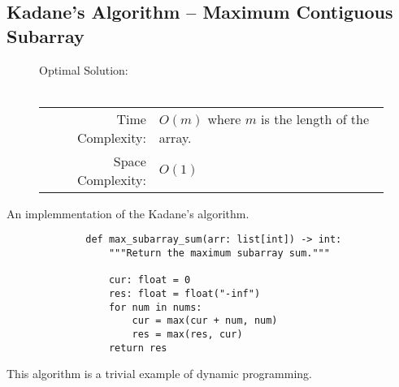 
\subsection{Kadane's Algorithm -- Maximum Contiguous Subarray}

\begin{figure}[H]
    Optimal Solution:\\\\
    \begin{tabular}{rl}
        Time Complexity:& \(O(m)\) where \(m\) is the length of the array.\\
        Space Complexity:& \(O(1)\)
    \end{tabular}
\end{figure}

An implemmentation of the Kadane's algorithm.

\begin{figure}[H]
    \centering
    \begin{verbatim}
        def max_subarray_sum(arr: list[int]) -> int:
            """Return the maximum subarray sum."""

            cur: float = 0
            res: float = float("-inf")
            for num in nums:
                cur = max(cur + num, num)
                res = max(res, cur)
            return res
    \end{verbatim}
\end{figure}

This algorithm is a trivial example of dynamic programming.
